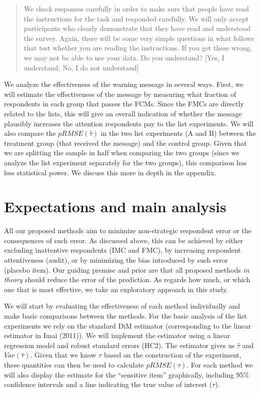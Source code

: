 \documentclass[]{article}
\begin{document}
\begin{quote}
We check responses carefully in order to make sure that people have read
the instructions for the task and responded carefully. We will only
accept participants who clearly demonstrate that they have read and
understood the survey. Again, there will be some very simple questions
in what follows that test whether you are reading the instructions. If
you get these wrong, we may not be able to use your data. Do you
understand? {[}Yes, I understand; No, I do not understand{]}
\end{quote}

We analyze the effectiveness of the warning message in several ways.
First, we will estimate the effectiveness of the message by measuring
what fraction of respondents in each group that passes the FCMs. Since
the FMCs are directly related to the lists, this will give an overall
indication of whether the message plausibly increases the attention
respondents pay to the list experiments. We will also compare the
\(pRMSE(\hat{\tau})\) in the two list experiments (A and B) between the
treatment group (that received the message) and the control group. Given
that we are splitting the sample in half when comparing the two groups
(since we analyze the list experiment separately for the two groups),
this comparison has less statistical power. We discuss this more in
depth in the appendix.

\hypertarget{expectations-and-main-analysis}{%
\section{Expectations and main
analysis}\label{expectations-and-main-analysis}}

All our proposed methods aim to minimize non-strategic respondent error
or the consequences of such error. As discussed above, this can be
achieved by either excluding inattentive respondents (IMC and FMC), by
increasing respondent attentiveness (audit), or by minimizing the bias
introduced by such error (placebo item). Our guiding premise and prior
are that all proposed methods \emph{in theory} should reduce the error
of the prediction. As regards how much, or which one that is most
effective, we take an exploratory approach in this study.

We will start by evaluating the effectiveness of each method
individually and make basic comparisons between the methods. For the
basic analysis of the list experiments we rely on the standard DiM
estimator (corresponding to the linear estimator in Imai (2011)). We
will implement the estimator using a linear regression model and robust
standard errors (HC2). The estimator gives us \(\hat{\tau}\) and
\(Var(\hat{\tau})\). Given that we know \(\tau\) based on the
construction of the experiment, these quantities can then be used to
calculate \(pRMSE(\hat{\tau})\). For each method we will also display
the estimate for the ``sensitive item'' graphically, including 95\%
confidence intervals and a line indicating the true value of interest
(\(\tau\)).
\end{document}
